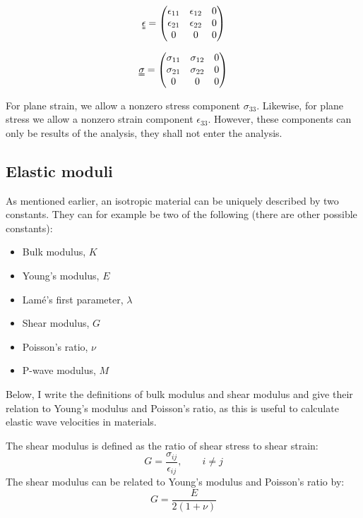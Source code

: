 \begin{equation}
\uuline \epsilon = 
\begin{pmatrix}
	\epsilon_{11} & \epsilon_{12} & 0 \\
	\epsilon_{21} & \epsilon_{22} & 0 \\
	0 & 0 & 0
\end{pmatrix}
\label{eq:plane_strain}
\end{equation}

\begin{equation}
\uuline \sigma = 
\begin{pmatrix}
	\sigma_{11} & \sigma_{12} & 0 \\
	\sigma_{21} & \sigma_{22} & 0 \\
	0 & 0 & 0
\end{pmatrix}
\label{eq:plane_stress}
\end{equation}

For plane strain, we allow a nonzero stress component $\sigma_{33}$. Likewise, for plane stress we allow a nonzero strain component $\epsilon_{33}$. However, these components can only be results of the analysis, they shall not enter the analysis. 

\subsection{Elastic moduli}
As mentioned earlier, an isotropic material can be uniquely described by two constants. They can for example be two of the following (there are other possible constants):
\begin{itemize}
\item Bulk modulus, $K$
\item Young's modulus, $E$
\item Lamé's first parameter, $\lambda$
\item Shear modulus, $G$
\item Poisson's ratio, $\nu$
\item P-wave modulus, $M$
\end{itemize}
Below, I write the definitions of bulk modulus and shear modulus and give their relation to Young's modulus and Poisson's ratio, as this is useful to calculate elastic wave velocities in materials.

The shear modulus is defined as the ratio of shear stress to shear strain:
\begin{equation}
	G = \frac{\sigma_{ij}}{\epsilon_{ij}}, \qquad i\neq j
\end{equation}
The shear modulus can be related to Young's modulus and Poisson's ratio by:
\begin{equation}
	G = \frac{E}{2(1+\nu)}
\end{equation}

